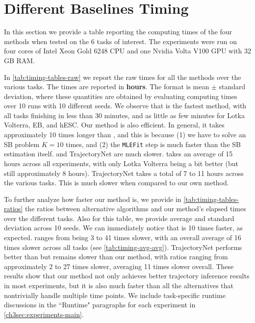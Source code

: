 \clearpage

\section{Different Baselines Timing}
\label{app:timing-table}

In this section we provide a table reporting the computing times of the four methods when tested on the 6 tasks of interest. The experiments were run on four cores of Intel Xeon Gold 6248 CPU and one Nvidia Volta V100 GPU with 32 GB RAM.  

In \cref{tab:timing-tables-raw} we report the raw times for all the methods over the various tasks. The times are reported in \textbf{hours}. The format is mean $\pm$ standard deviation, where these quantities are obtained by evaluating computing times over 10 runs with 10 different seeds. We observe that \vanilla{} is the fastest method, with all tasks finishing in less than 30 minutes, and as little as few minutes for Lotka Volterra, EB, and hESC. Our method is also efficient. In general, it takes approximately 10 times longer than \vanilla{}, and this is because (1) we have to solve an SB problem $K=10$ times, and (2) the \texttt{MLEFit} step is much faster than the SB estimation itself. \dmsbname{} and TrajectoryNet are much slower. \dmsbname{} takes an average of 15 hours across all experiments, with only Lotka Volterra being a bit better (but still approximately 8 hours). TrajectoryNet takes a total of 7 to 11 hours across the various tasks. This is much slower when compared to our own method. 

To further analyze how faster our method is, we provide in \cref{tab:timing-tables-ratios} the ratios between alternative algorithms and our method's elapsed times over the different tasks. Also for this table, we provide average and standard deviation across 10 seeds. We can immediately notice that \vanilla{} is 10 times faster, as expected. \dmsbname{} ranges from being 3 to 41 times slower, with an overall average of 16 times slower across all tasks (see \cref{tab:timing-avg-avg}). TrajectoryNet performs better than \dmsbname{} but remains slower than our method, with ratios ranging from approximately 2 to 27 times slower, averaging 11 times slower overall. These results show that our method not only achieves better trajectory inference results in most experiments, but it is also much faster than all the alternatives that nontrivially handle multiple time points. We include task-specific runtime discussions in the ``Runtime" paragraphs for each experiment in \cref{ch3sec:experiments-main}.

